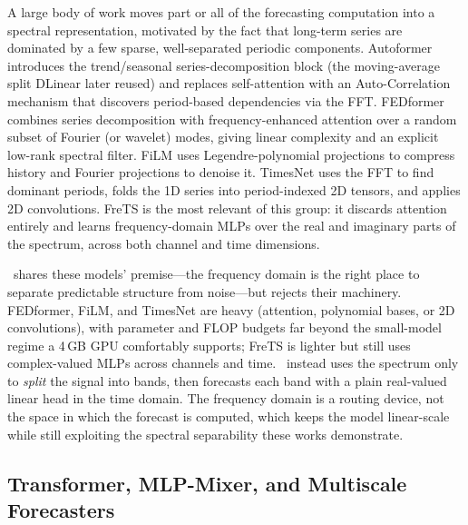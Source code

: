 A large body of work moves part or all of the forecasting computation into a
spectral representation, motivated by the fact that long-term series are
dominated by a few sparse, well-separated periodic components. Autoformer
\citep{wu2021autoformer} introduces the trend/seasonal series-decomposition
block (the moving-average split DLinear later reused) and replaces self-attention
with an Auto-Correlation mechanism that discovers period-based dependencies via
the FFT. FEDformer \citep{zhou2022fedformer} combines series decomposition with
frequency-enhanced attention over a random subset of Fourier (or wavelet) modes,
giving linear complexity and an explicit low-rank spectral filter. FiLM
\citep{zhou2022film} uses Legendre-polynomial projections to compress history and
Fourier projections to denoise it. TimesNet \citep{wu2023timesnet} uses the FFT
to find dominant periods, folds the 1D series into period-indexed 2D tensors, and
applies 2D convolutions. FreTS \citep{yi2023frets} is the most relevant of this
group: it discards attention entirely and learns frequency-domain MLPs over the
real and imaginary parts of the spectrum, across both channel and time
dimensions.

\method\ shares these models' premise---the frequency domain is the right place
to separate predictable structure from noise---but rejects their machinery.
FEDformer, FiLM, and TimesNet are heavy (attention, polynomial bases, or 2D
convolutions), with parameter and FLOP budgets far beyond the small-model regime
a 4\,GB GPU comfortably supports; FreTS is lighter but still uses complex-valued
MLPs across channels and time. \method\ instead uses the spectrum only to
\emph{split} the signal into bands, then forecasts each band with a plain
real-valued linear head in the time domain. The frequency domain is a routing
device, not the space in which the forecast is computed, which keeps the model
linear-scale while still exploiting the spectral separability these works
demonstrate.

\subsection{Transformer, MLP-Mixer, and Multiscale Forecasters}
\label{sec:related:transformer}

